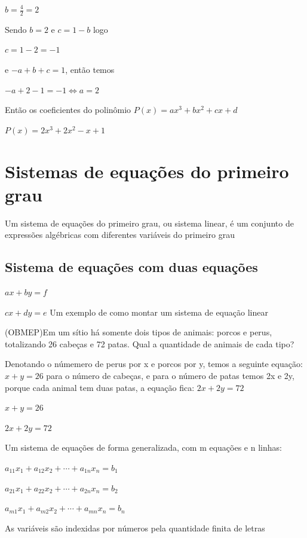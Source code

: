 \begin{multicols*}{2}
\begin{enumerate}
\begin{enumerate}
                        $b = \frac{4}{2} = 2$

                        Sendo $b = 2$ e $c = 1 - b$ logo

                        $c = 1 - 2 = -1$

                        e $-a+b+c = 1$, então temos

                        $-a +2 - 1 = -1 \Leftrightarrow a = 2$

                        Então os coeficientes do polinômio $P(x) = ax^3 + bx^2 + cx + d$

                        $P(x) = 2x^3 +2x^2 -x +1$
              \end{enumerate}
    \end{enumerate}

    \section{Sistemas de equações do primeiro grau}
    Um sistema de equações do primeiro grau, ou sistema linear, é um conjunto de expressões 				algébricas com diferentes variáveis do primeiro grau
    \subsection{Sistema de equações com duas equações}
    $ax + by = f $

    $cx + dy = e$
    Um exemplo de como montar um sistema de equação linear

    (OBMEP)Em um sítio há somente dois tipos de animais: porcos e perus, totalizando 26 cabeças e 			72 patas. Qual a quantidade de animais de cada tipo?

    Denotando o númemero de perus por x e porcos por y, temos a seguinte equação: $x + y =26$ para 			o número de cabeças, e para o número de patas temos 2x e 2y, porque cada animal tem duas patas, 		a equação fica: $2x + 2y = 72$

    $x+y=26$

    $2x+2y = 72$

    Um sistema de equações de forma generalizada, com m equações e n linhas:

    $a_{11}x_1 + a_{12}x_2 + \cdots + a_{1n}x_n = b_1$

    $a_{21}x_1 + a_{22}x_2 + \cdots + a_{2n}x_n = b_2$

    $a_{m1}x_1 + a_{m2}x_2 + \cdots + a_{mn}x_n = b_n$

    As variáveis são indexidas por números pela quantidade finita de letras


\end{multicols*}
